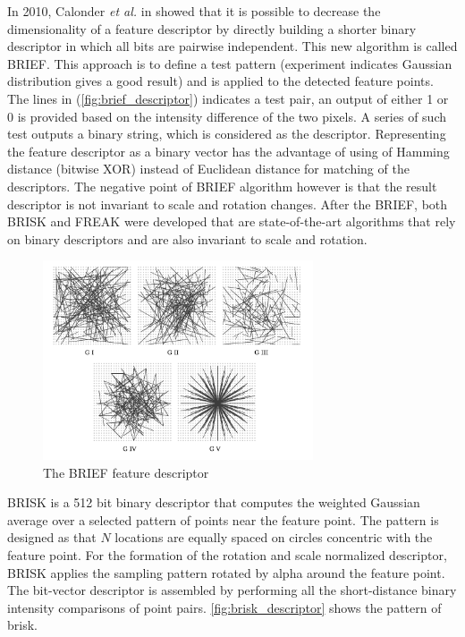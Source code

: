 In 2010, Calonder \textit{et al.} in \cite{calonder2010brief} showed that it is possible to decrease the dimensionality of a feature descriptor by directly building a shorter binary descriptor in which all bits are pairwise independent. This new algorithm is called BRIEF. This approach is to define a test pattern (experiment indicates Gaussian distribution gives a good result) and is applied to the detected feature points. The lines in (\autoref{fig:brief_descriptor}) indicates a test pair, an output of either 1 or 0 is provided based on the intensity difference of the two pixels. A series of such test outputs a binary string, which is considered as the descriptor. Representing the feature descriptor as a binary vector has the advantage of using of Hamming distance (bitwise XOR) instead of Euclidean distance for matching of the descriptors. The negative point of BRIEF algorithm however is that the result descriptor is not invariant to scale and rotation changes. After the BRIEF, both BRISK \cite{leutenegger2011brisk} and FREAK \cite{alahi2012freak} were developed that are state-of-the-art algorithms that rely on binary descriptors and are also invariant to scale and rotation. \\

\begin{figure}[H]
  \centering
  \includegraphics[width=80mm]{figures/brief_descriptor}
  \caption{The BRIEF feature descriptor}\label{fig:brief_descriptor}
\end{figure}

BRISK is a 512 bit binary descriptor that computes the weighted Gaussian average over a selected pattern of points near the feature point. The pattern is designed as that $N$ locations are equally spaced on circles concentric with the feature point. For the formation of the rotation and scale normalized descriptor, BRISK applies the sampling pattern rotated by alpha around the feature point. The bit-vector descriptor is assembled by performing all the short-distance binary intensity comparisons of point pairs. \autoref{fig:brisk_descriptor} shows the pattern of brisk.\\

